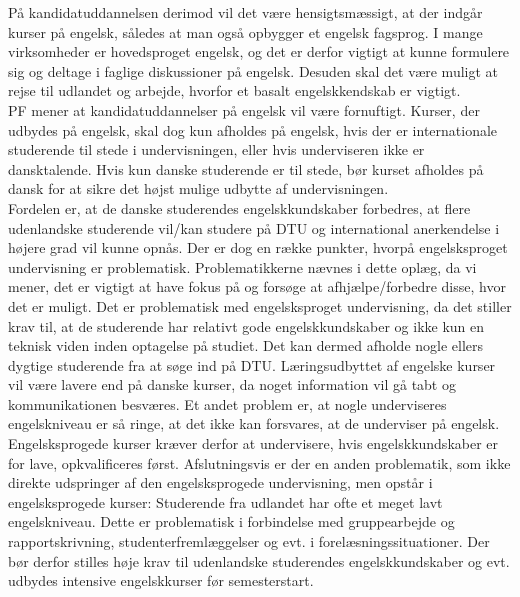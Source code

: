 På kandidatuddannelsen derimod vil det være hensigtsmæssigt, at der indgår kurser på engelsk, således at man også opbygger et engelsk fagsprog. I mange virksomheder er hovedsproget engelsk, og det er derfor vigtigt at kunne formulere sig og deltage i faglige diskussioner på engelsk. Desuden skal det være muligt at rejse til udlandet og arbejde, hvorfor et basalt engelskkendskab er vigtigt.\\

PF mener at kandidatuddannelser på engelsk vil være fornuftigt. Kurser, der udbydes på engelsk, skal dog kun afholdes på engelsk, hvis der er internationale studerende til stede i undervisningen, eller hvis underviseren ikke er dansktalende. Hvis kun danske studerende er til stede, bør kurset afholdes på dansk for at sikre det højst mulige udbytte af
undervisningen.\\

Fordelen er, at de danske studerendes engelskkundskaber forbedres, at flere udenlandske studerende vil/kan studere på DTU og international anerkendelse i højere grad vil kunne opnås. Der er dog en række punkter, hvorpå engelsksproget undervisning er problematisk. Problematikkerne nævnes i dette oplæg, da vi mener, det er vigtigt at have fokus på og forsøge at afhjælpe/forbedre disse, hvor det er muligt. Det er problematisk med engelsksproget undervisning, da det stiller krav til, at de studerende har relativt gode engelskkundskaber og ikke kun en teknisk viden inden optagelse på studiet. Det kan dermed afholde nogle ellers dygtige studerende fra at søge ind på DTU. Læringsudbyttet af engelske kurser vil være lavere end på danske kurser, da noget information vil gå tabt og kommunikationen besværes. Et andet problem er, at nogle underviseres engelskniveau er så ringe, at det ikke kan forsvares, at de underviser på engelsk. Engelsksprogede kurser kræver derfor at undervisere, hvis engelskkundskaber er for lave, opkvalificeres først. Afslutningsvis er der en anden problematik, som ikke direkte udspringer af den engelsksprogede undervisning, men opstår i engelsksprogede kurser: Studerende fra udlandet har ofte et meget lavt engelskniveau. Dette er problematisk i forbindelse med gruppearbejde og rapportskrivning, studenterfremlæggelser og evt. i forelæsningssituationer. Der bør derfor stilles høje krav til udenlandske studerendes engelskkundskaber og evt. udbydes intensive engelskkurser før
semesterstart. \\

